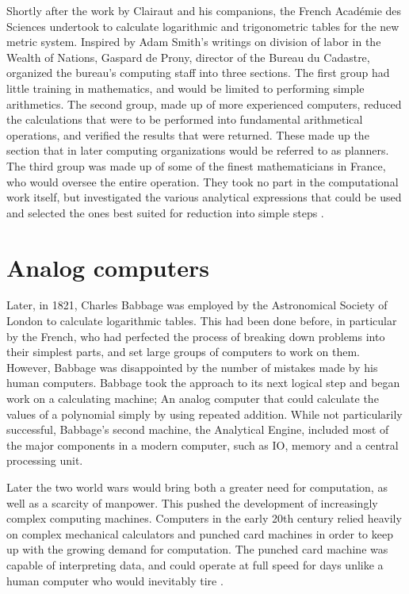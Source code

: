 \documentclass[\rootfolder/main.tex]{subfiles}
\begin{document}
Shortly after the work by Clairaut and his companions, the French Académie des Sciences undertook to calculate logarithmic and trigonometric tables for the new metric system.
Inspired by Adam Smith's writings on division of labor in the Wealth of Nations, Gaspard de Prony, director of the Bureau du Cadastre, organized the bureau's computing staff into three sections.
The first group had little training in mathematics, and would be limited to performing simple arithmetics.
The second group, made up of more experienced computers, reduced the calculations that were to be performed into fundamental arithmetical operations, and verified the results that were returned.
These made up the section that in later computing organizations would be referred to as planners.
The third group was made up of some of the finest mathematicians in France, who would oversee the entire operation.
They took no part in the computational work itself, but investigated the various analytical expressions that could be used and selected the ones best suited for reduction into simple steps \cite{hyman1985}.

\section{Analog computers}

Later, in 1821, Charles Babbage was employed by the Astronomical Society of London to calculate logarithmic tables.
This had been done before, in particular by the French, who had perfected the process of breaking down problems into their simplest parts, and set large groups of computers to work on them.
However, Babbage was disappointed by the number of mistakes made by his human computers.
Babbage took the approach to its next logical step and began work on a calculating machine; An analog computer that could calculate the values of a polynomial simply by using repeated addition.
While not particularily successful, Babbage's second machine, the Analytical Engine, included most of the major components in a modern computer, such as IO, memory and a central processing unit.

Later the two world wars would bring both a greater need for computation, as well as a scarcity of manpower.
This pushed the development of increasingly complex computing machines.
Computers in the early 20th century relied heavily on complex mechanical calculators and punched card machines in order to keep up with the growing demand for computation.
The punched card machine was capable of interpreting data, and could operate at full speed for days unlike a human computer who would inevitably tire \cite{carr}.
\end{document}
